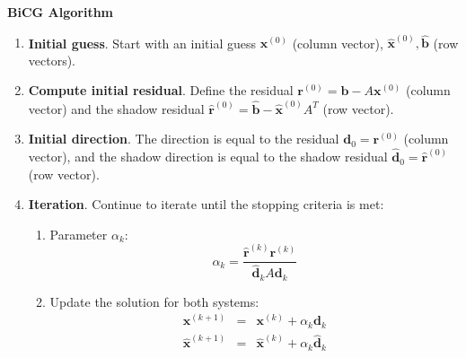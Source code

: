 \highspace
\begin{flushleft}
    \textcolor{Green3}{ \textbf{BiCG Algorithm}}
\end{flushleft}
\begin{enumerate}
    \item \textbf{Initial guess}. Start with an initial guess $\mathbf{x}^{\left(0\right)}$ (column vector), $\widehat{\mathbf{x}}^{\left(0\right)}, \widehat{\mathbf{b}}$ (row vectors).
    
    \item \textbf{Compute initial residual}. Define the residual $\mathbf{r}^{\left(0\right)} = \mathbf{b} - A\mathbf{x}^{\left(0\right)}$ (column vector) and the shadow residual $\widehat{\mathbf{r}}^{\left(0\right)} = \widehat{\mathbf{b}} - \widehat{\mathbf{x}}^{\left(0\right)}A^{T}$ (row vector).
    
    \item \textbf{Initial direction}. The direction is equal to the residual $\mathbf{d}_{0} = \mathbf{r}^{\left(0\right)}$ (column vector), and the shadow direction is equal to the shadow residual $\widehat{\mathbf{d}}_{0} = \widehat{\mathbf{r}}^{\left(0\right)}$ (row vector).

    \item \textbf{Iteration}. Continue to iterate until the stopping criteria is met:
    \begin{enumerate}
        \item Parameter $\alpha_{k}$:
        \begin{equation*}
            \alpha_{k} = \dfrac{
                \widehat{\mathbf{r}}^{\left(k\right)} \mathbf{r}^{\left(k\right)}
            }{
                \widehat{\mathbf{d}}_{k} A \mathbf{d}_{k}
            }
        \end{equation*}

        \item Update the solution for both systems:
        \begin{equation*}
            \begin{array}{rcl}
                \mathbf{x}^{\left(k+1\right)} &=& \mathbf{x}^{\left(k\right)} + \alpha_{k}\mathbf{d}_{k} \\ [.5em]
                \widehat{\mathbf{x}}^{\left(k+1\right)} &=& \widehat{\mathbf{x}}^{\left(k\right)} + \alpha_{k}\widehat{\mathbf{d}}_{k}
            \end{array}
        \end{equation*}


\end{enumerate}
\end{enumerate}
